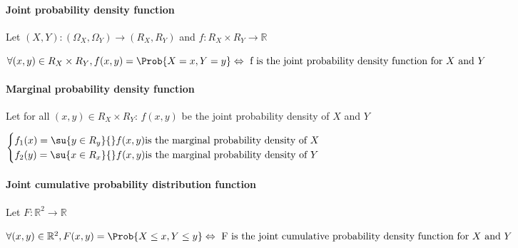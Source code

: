 \paragraph{Joint probability density function}
Let $\left(X,Y\right):\left(\Omega_{X},\Omega_{Y}\right)\rightarrow\left(R_{X},R_{Y}\right)$ and $f:R_{X}\times R_{Y}\rightarrow \mathbb{R}$
\begin{center}
	$\forall (x,y)\in R_{X}\times R_{Y},f(x,y)=\Prob{X=x,Y=y}\Leftrightarrow\text{ f is the joint probability density function for }X\text{ and }Y$
\end{center}
\paragraph{Marginal probability density function}
Let for all $(x,y)\in R_{X}\times R_{Y}$: $f(x,y)$ be the joint probability density of $X$ and $Y$
\begin{center}
$\begin{cases}
	f_{1}(x)=\su{ {y\in R_{y}}}{}f(x,y)\text{is the marginal probability density of }X\\
	f_{2}(y)=\su{ {x\in R_{x}}}{}f(x,y)\text{is the marginal probability density of }Y
\end{cases}$
\end{center}
\paragraph{Joint cumulative probability distribution function}
Let $F:\mathbb{R}^{2}\rightarrow\mathbb{R}$
\begin{center}
	$\forall (x,y)\in \mathbb{R}^{2},F(x,y)=\Prob{X\leq x,Y\leq y}\Leftrightarrow\text{ F is the joint cumulative probability density function for }X\text{ and }Y$
\end{center}
